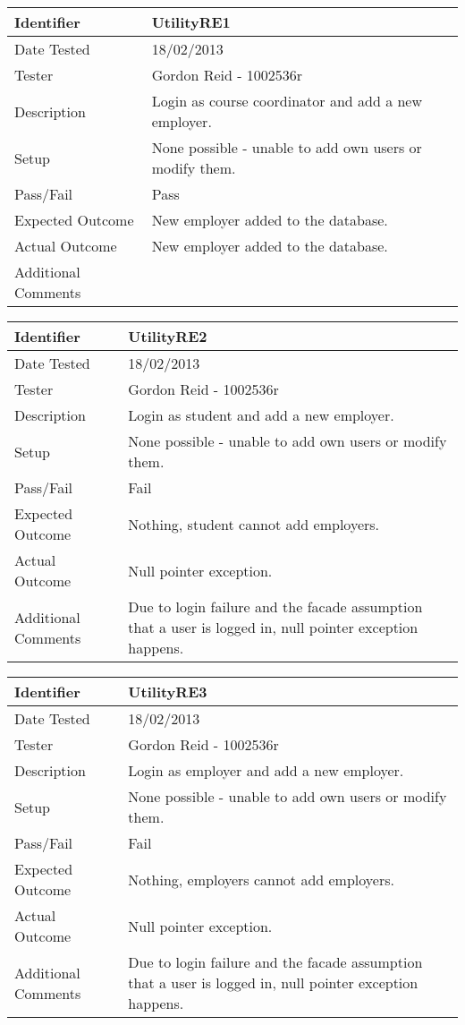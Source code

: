 \begin{tabularx}{\textwidth}{|T|L|}
\hline
Identifier & UtilityRE1\\
\hline
Date Tested & 18/02/2013\\
\hline
Tester & Gordon Reid - 1002536r\\
\hline
Description & Login as course coordinator and add a new employer.\\
\hline
Setup & None possible - unable to add own users or modify them.\\
\hline
Pass/Fail & Pass\\
\hline
Expected Outcome & New employer added to the database.\\
\hline
Actual Outcome & New employer added to the database.\\
\hline
Additional Comments &\\
\hline
\end{tabularx}

\vspace{2em}

\begin{tabularx}{\textwidth}{|T|L|}
\hline
Identifier & UtilityRE2\\
\hline
Date Tested & 18/02/2013\\
\hline
Tester & Gordon Reid - 1002536r\\
\hline
Description & Login as student and add a new employer.\\
\hline
Setup & None possible - unable to add own users or modify them.\\
\hline
Pass/Fail & Fail\\
\hline
Expected Outcome & Nothing, student cannot add employers.\\
\hline
Actual Outcome & Null pointer exception.\\
\hline
Additional Comments & Due to login failure and the facade assumption that a user 
is logged in, null pointer exception happens.\\
\hline
\end{tabularx}

\vspace{2em}

\begin{tabularx}{\textwidth}{|T|L|}
\hline
Identifier & UtilityRE3\\
\hline
Date Tested & 18/02/2013\\
\hline
Tester & Gordon Reid - 1002536r\\
\hline
Description & Login as employer and add a new employer.\\
\hline
Setup & None possible - unable to add own users or modify them.\\
\hline
Pass/Fail & Fail\\
\hline
Expected Outcome & Nothing, employers cannot add employers.\\
\hline
Actual Outcome & Null pointer exception.\\
\hline
Additional Comments & Due to login failure and the facade assumption that a user 
is logged in, null pointer exception happens.\\
\hline
\end{tabularx}

\vspace{2em}
